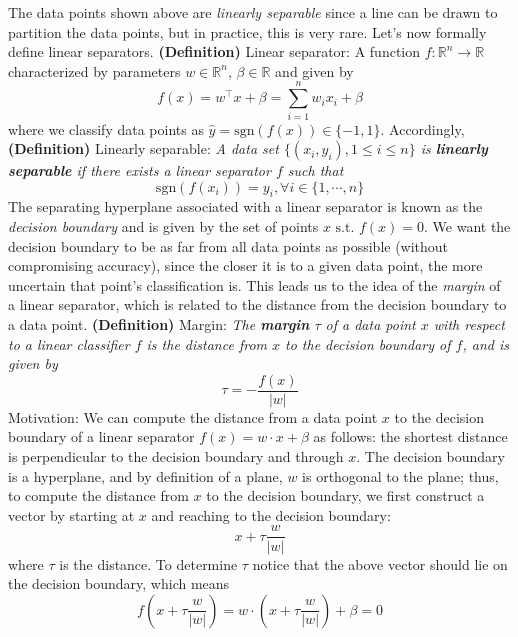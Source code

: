 \documentclass{article}
\begin{document}
The data points shown above are \textit{linearly separable} since a line can be drawn to partition the data points, but in practice, this is very rare. Let's now formally define linear separators.
\newline \newline
\textbf{(Definition)} Linear separator: A function $ f: \mathbb{R}^n \rightarrow \mathbb{R} $ characterized by parameters $ w \in \mathbb{R}^n $, $ \beta \in \mathbb{R} $ and given by
$$ f(x) = w^\intercal x + \beta = \sum_{i = 1}^n w_i x_i + \beta $$
where we classify data points as $ \hat{y} = \text{sgn} \left( f(x) \right) \in \{-1, 1\} $.
Accordingly,
\newline \newline
\textbf{(Definition)} Linearly separable: \textit{A data set $ \{(x_i, y_i), 1 \leq i \leq n\} $ is \textbf{linearly separable} if there exists a linear separator $ f $ such that}
$$ \text{sgn} \left( f(x_i) \right) = y_i, \forall i \in \{1, \cdots, n\} $$
The separating hyperplane associated with a linear separator is known as the \textit{decision boundary} and is given by the set of points $ x \text{ s.t. } f(x) = 0 $. We want the decision boundary to be as far from all data points as possible (without compromising accuracy), since the closer it is to a given data point, the more uncertain that point's classification is. This leads us to the idea of the \textit{margin} of a linear separator, which is related to the distance from the decision boundary to a data point. 
\newline \newline
\textbf{(Definition)} Margin: \textit{The \textbf{margin} $ \tau $ of a data point $ x $ with respect to a linear classifier $ f $ is the distance from $ x $ to the decision boundary of $ f $, and is given by}
$$ \tau = - \frac{f(x)}{|w|} $$
Motivation: We can compute the distance from a data point $ x $ to the decision boundary of a linear separator $ f(x) = w \cdot x + \beta $ as follows: the shortest distance is perpendicular to the decision boundary and through $ x $. The decision boundary is a hyperplane, and by definition of a plane, $ w $ is orthogonal to the plane; thus, to compute the distance from $ x $ to the decision boundary, we first construct a vector by starting at $ x $ and reaching to the decision boundary:
$$ x + \tau \frac{w}{|w|} $$
where $ \tau $ is the distance. To determine $ \tau $ notice that the above vector should lie on the decision boundary, which means
$$ f(x + \tau \frac{w}{|w|}) = w \cdot \left( x + \tau \frac{w}{|w|} \right) + \beta = 0 $$
\end{document}
